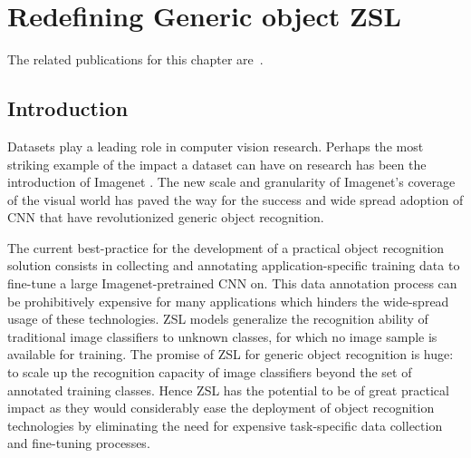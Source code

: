 \chapter{Redefining Generic object ZSL}
\label{chap:benchmark}

\ifpdf
    \graphicspath{{Benchmark/fig/}}
\else
    \graphicspath{{Benchmark/fig/}}
\fi

The related publications for this chapter are~\cite{}.

\section{Introduction}

Datasets play a leading role in computer vision research.
Perhaps the most striking example of the impact a dataset can have on research has been the introduction of Imagenet \cite{deng2009imagenet}.
The new scale and granularity of Imagenet's coverage of the visual world has paved the way for the success and wide spread adoption of 
CNN \cite{krizhevsky2012imagenet,lecun1998gradient} that have revolutionized generic object recognition.

The current best-practice for the development of a practical object recognition solution consists in 
collecting and annotating application-specific training data to fine-tune a large Imagenet-pretrained CNN on. 
This data annotation process can be prohibitively expensive for many applications which hinders the wide-spread usage of these technologies.
ZSL models generalize the recognition ability of traditional image classifiers to unknown classes, for which no image sample is available for training.
The promise of ZSL for generic object recognition is huge: 
to scale up the recognition capacity of image classifiers beyond the set of annotated training classes.
Hence ZSL has the potential to be of great practical impact as they would considerably ease the deployment of object recognition technologies
by eliminating the need for expensive task-specific data collection and fine-tuning processes.

